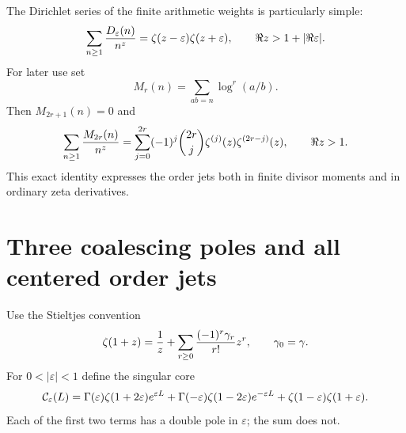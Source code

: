 \documentclass[11pt,a4paper]{article}
\numberwithin{equation}{section}
\theoremstyle{definition}\newtheorem{definition}[theorem]{Definition}
\theoremstyle{remark}\newtheorem{remark}[theorem]{Remark}
\newcommand{\eps}{\varepsilon}
\begin{document}
The Dirichlet series of the finite arithmetic weights is particularly
simple:
\begin{equation}\label{eq:weight-dirichlet}
 \sum_{n\ge1}{D_\eps(n)\over n^z}
 =\zeta(z-\eps)\zeta(z+\eps),\qquad \Re z>1+|\Re\eps|.
\end{equation}
For later use set
\begin{equation}\label{eq:divisor-moments}
 M_r(n)=\sum_{ab=n}\log^r(a/b).
\end{equation}
Then $M_{2r+1}(n)=0$ and
\begin{equation}\label{eq:moment-zeta}
 \sum_{n\ge1}{M_{2r}(n)\over n^z}
 =\sum_{j=0}^{2r}(-1)^j\binom{2r}{j}
 \zeta^{(j)}(z)\zeta^{(2r-j)}(z),\qquad \Re z>1.
\end{equation}
This exact identity expresses the order jets both in finite divisor
moments and in ordinary zeta derivatives.

\section{Three coalescing poles and all centered order jets}
\label{sec:collision}
Use the Stieltjes convention
\begin{equation}\label{eq:stieltjes}
 \zeta(1+z)=\frac1z+\sum_{r\ge0}{(-1)^r\gamma_r\over r!}z^r,
 \qquad \gamma_0=\gamma.
\end{equation}
For $0<|\eps|<1$ define the singular core
\begin{equation}\label{eq:core}
 \CC_\eps(L)=\Gamma(\eps)\zeta(1+2\eps)e^{\eps L}
 +\Gamma(-\eps)\zeta(1-2\eps)e^{-\eps L}
 +\zeta(1-\eps)\zeta(1+\eps).
\end{equation}
Each of the first two terms has a double pole in $\eps$; the sum does not.
\end{document}
